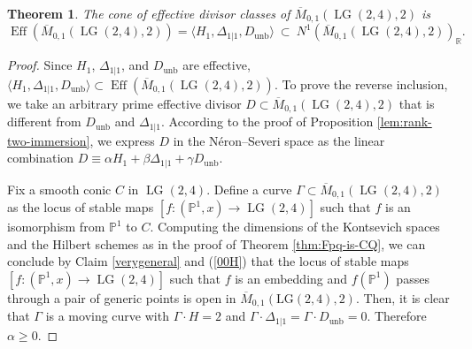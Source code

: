 \documentclass[10pt]{amsart}
\newtheorem{theorem}{Theorem}[section]
\theoremstyle{definition}
\newcommand{\LG}{\operatorname{LG}}
\DeclareMathOperator{\unb}{unb}
\newcommand{\PP}{\mathbb{P}}
\theoremstyle{plain} %
\begin{document}
\begin{theorem}\label{thm:Eff-M01-LG24-k1}
The cone of effective divisor classes of $\overline{M}_{0,1}(\LG(2,4),2)$ is
\[
\operatorname{Eff}(\overline{M}_{0,1}(\LG(2,4),2))
=
\langle H_1, \Delta_{1|1}, D_{\unb}\rangle
\ \subset\ N^1(\overline{M}_{0,1}(\LG(2,4),2))_{\mathbb{R}}.
\]
\end{theorem}
\begin{proof}
Since $H_1$, $\Delta_{1|1}$, and $D_{\unb}$ are effective,  $\langle H_1, \Delta_{1|1}, D_{\unb}\rangle\subset\operatorname{Eff}(\overline{M}_{0,1}(\LG(2,4),2))$.
To prove the reverse inclusion, we take an arbitrary prime effective divisor 
$D\subset \overline{M}_{0,1}(\LG(2,4),2)$ that is different from $D_{\unb}$ and $\Delta_{1|1}$. According to the proof of Proposition \ref{lem:rank-two-immersion}, we express $D$ in the Néron--Severi space as the linear combination 
$D\equiv \alpha H_1 + \beta \Delta_{1|1} + \gamma D_{\mathrm{unb}}$.

Fix a smooth conic $C$ in $\LG(2,4)$. Define a curve  $\Gamma\subset\overline{M}_{0,1}(\LG(2,4),2)$ as the locus of stable maps $[f\colon (\PP^1,x)\rightarrow \LG(2,4)]$ such that $f$ is an isomorphism from $\PP^1$ to $C$. Computing the dimensions of the Kontsevich spaces and the Hilbert schemes as in the proof of Theorem \ref{thm:Fpq-is-CQ}, we can conclude by Claim \ref{verygeneral} and (\ref{00H}) that 
the locus of stable maps $[f\colon (\PP^1,x)\rightarrow \LG(2,4)]$ such that $f$ is an embedding and $f(\PP^1)$ passes through a pair of generic points is open in $\overline{M}_{0,1}(\mathrm{LG}(2,4),2)$. Then, it is clear that $\Gamma$ is a moving curve with $\Gamma\cdot H=2$ and $\Gamma\cdot \Delta_{1|1}=\Gamma\cdot D_{\unb}=0$. Therefore $\alpha\geq0$.


\end{proof}
\end{document}
